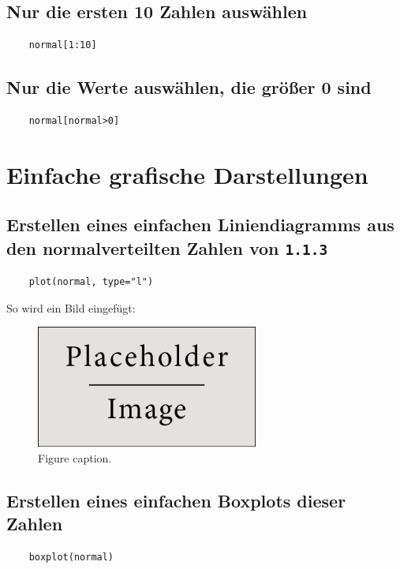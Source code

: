 \documentclass{article}
\begin{document}
\subsection{Nur die ersten 10 Zahlen auswählen}
\begin{lstlisting}
	normal[1:10]
\end{lstlisting}

\subsection{Nur die Werte auswählen, die größer 0 sind}
\begin{lstlisting}
	normal[normal>0]
\end{lstlisting}


\section{Einfache grafische Darstellungen}

\subsection{Erstellen eines einfachen Liniendiagramms aus den normalverteilten Zahlen von \texttt{1.1.3}}
\begin{lstlisting}
	plot(normal, type="l")
\end{lstlisting}

So wird ein Bild eingefügt:

\begin{figure}[H]
	\begin{center}
		\includegraphics[width=0.65\textwidth]{../images/placeholder} %
		\caption{Figure caption.}
	\end{center}
\end{figure}

\subsection{Erstellen eines einfachen Boxplots dieser Zahlen}
\begin{lstlisting}
	boxplot(normal)
\end{lstlisting}
\end{document}
